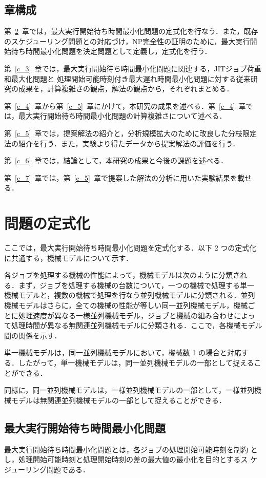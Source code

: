 \documentclass[12pt]{optlab-bachelor}
\begin{document}
\begin{description}
\end{description}

\section{章構成}
第~\ref{c_2}~章では，最大実行開始待ち時間最小化問題の定式化を行なう．また，既存のスケジューリング問題との対応づけ，NP完全性の証明のために，最大実行開始待ち時間最小化問題を決定問題として定義し，定式化を行う．

第~\ref{c_3}~章では，最大実行開始待ち時間最小化問題に関連する，JITジョブ荷重和最大化問題と
処理開始可能時刻付き最大遅れ時間最小化問題に対する従来研究の成果を，計算複雑さの観点，解法の観点から，それぞれまとめる．

第~\ref{c_4}~章から第~\ref{c_5}~章にかけて，本研究の成果を述べる．第~\ref{c_4}~章では，最大実行開始待ち時間最小化問題の計算複雑さについて述べる．

第~\ref{c_5}~章では，提案解法の紹介と，分析規模拡大のために改良した分枝限定法の紹介を行う．また，実験より得たデータから提案解法の評価を行う．

第~\ref{c_6}~章では，結論として，本研究の成果と今後の課題を述べる．

第~\ref{c_7}~章では，第~\ref{c_5}~章で提案した解法の分析に用いた実験結果を載せる．

\chapter{問題の定式化}\label{c_2}
ここでは，最大実行開始待ち時間最小化問題を定式化する．以下 2 つの定式化に共通する，機械モデルについて示す．

各ジョブを処理する機械の性能によって，機械モデルは次のように分類され
る．まず，ジョブを処理する機械の台数について，一つの機械で処理する単一
機械モデルと，複数の機械で処理を行なう並列機械モデルに分類される．並列
機械モデルはさらに，全ての機械の性能が等しい同一並列機械モデル，機械ご
とに処理速度が異なる一様並列機械モデル，ジョブと機械の組み合わせによっ
て処理時間が異なる無関連並列機械モデルに分類される．ここで，各機械モデル間の関係を示す．

単一機械モデルは，同一並列機械モデルにおいて，機械数 1 の場合と対応する．したがって，単一機械モデルは，同一並列機械モデルの一部として捉えることができる．

同様に，同一並列機械モデルは，一様並列機械モデルの一部として，一様並列機械モデルは無関連並列機械モデルの一部として捉えることができる．

\section{最大実行開始待ち時間最小化問題}
最大実行開始待ち時間最小化問題とは，各ジョブの処理開始可能時刻を制約
とし，処理開始可能時刻と処理開始時刻の差の最大値の最小化を目的とするス
ケジューリング問題である．
\end{document}
